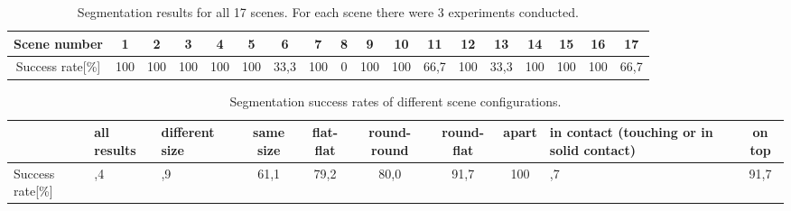 \begin{table}[h!]\scriptsize
\centering 
\begin{tabular}{|c|c| c| c| c| c| c|c|c|c|c|c|c|c|c|c|c|c|}
\hline    Scene   number    &1   &    2    &   3    &4   &5&6&7&    8&
9&10&11&12&13&14&15&16&17\\ \hline  Success rate[\%] & 100  & 100 &100
&100&100&33,3  & 100  &  0  & 100&  100&  66,7& 100&33,3  &100&100&100
&66,7\\\hline
\end{tabular}
\caption{Segmentation results for  all 17 scenes.  For each scene there  were 3 experiments conducted.}
      \label{tab:chart_result}
\end{table}

\begin{table}[h!]\scriptsize
\begin{tabular}{|m{1cm} |p{1cm}| p{1.2cm}| c| c| c| c|c|p{2.7cm}|c|}
\hline    & \centering all    results   &  \centering  different    size    &   same    size
&flat-flat&round-round&round-flat & \centering apart & in contact (touching or in
solid contact) & on top\\ \hline Success rate[\%] & \centering 82,4 & \centering 93,9 &  61,1
&  79,2 & 80,0 & 91,7 & 100 & \centering 66,7 & 91,7\\\hline
\end{tabular}
\caption{Segmentation success rates of different scene configurations.
}
\label{tab:result_percentage}
\end{table}

